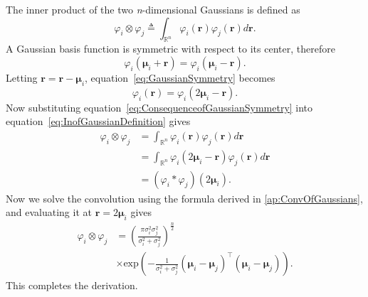 \documentclass[5p,authoryear]{elsarticle}
\begin{document}
The inner product of the two \emph{n}-dimensional Gaussians is defined as
\begin{equation}\label{eq:InofGaussianDefinition}
\varphi_i\otimes\varphi_j \triangleq \int_{\mathbb{R}^n}\varphi_i(\mathbf r)\varphi_j(\mathbf r)d\mathbf{r}.
\end{equation}
A Gaussian basis function is symmetric with respect to its center, therefore
\begin{equation}\label{eq:GaussianSymmetry}
 \varphi_i(\boldsymbol \mu_i+\mathbf r)= \varphi_i(\boldsymbol \mu_i-\mathbf r).
\end{equation}
Letting $\mathbf{r}= \mathbf{r}-\boldsymbol{\mu}_i$, equation~\ref{eq:GaussianSymmetry} becomes
\begin{equation}\label{eq:ConsequenceofGaussianSymmetry}
 \varphi_i(\mathbf r)= \varphi_i(2\boldsymbol \mu_i-\mathbf r).
\end{equation}
Now substituting equation~\ref{eq:ConsequenceofGaussianSymmetry} into equation~\ref{eq:InofGaussianDefinition} gives 
\begin{align}
\varphi_i\otimes\varphi_j&=\int_{\mathbb{R}^n}\varphi_i(\mathbf r)\varphi_j(\mathbf r)d\mathbf r \nonumber\\
&=\int_{\mathbb{R}^n}\varphi_i(2\boldsymbol \mu_i-\mathbf r)\varphi_j(\mathbf r)d\mathbf r \nonumber\\
&=(\varphi_i*\varphi_j)(2\boldsymbol \mu_i).
\end{align}
Now we solve the convolution using the formula derived in \ref{ap:ConvOfGaussians}, and evaluating it at $\mathbf r=2\boldsymbol\mu_i $ gives
\begin{align}
 \varphi_i\otimes\varphi_j&=\left(\frac{\pi\sigma_i^2\sigma_j^2}{\sigma_i^2+\sigma_j^2}\right)^{\frac{n}{2}} \nonumber \\
&\times\mathrm{exp}\left({-\frac{1}{\sigma_i^2+\sigma_j^2} (\boldsymbol\mu_i-\boldsymbol\mu_j)^\top(\boldsymbol\mu_i-\boldsymbol\mu_j)}\right).
\end{align}
This completes the derivation.
\end{document}
